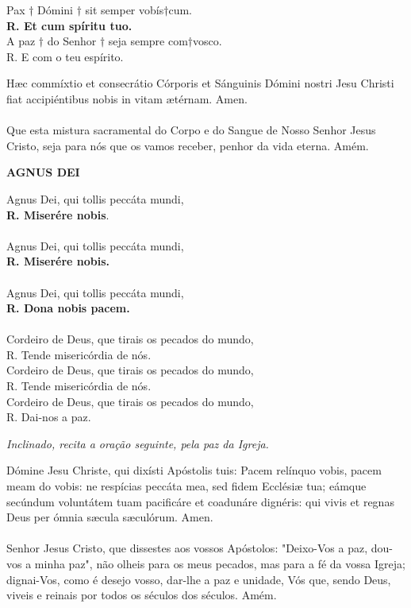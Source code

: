 \begin{multicols}{2}
	\noindent Pax $\dag$ Dómini $\dag$ sit semper vobís$\dag$cum. 
	\\ \textbf{R. Et cum spíritu tuo. }
	\\ A paz $\dag$ do Senhor $\dag$ seja sempre com$\dag$vosco.
	\\ R. E com o teu espírito.
\end{multicols}
\begin{multicols}{2}
	\noindent Hæc commíxtio et consecrátio Córporis et
	Sánguinis Dómini nostri Jesu Christi fiat
	accipiéntibus nobis in vitam ætérnam. Amen.
	\\
	\\ Que esta mistura sacramental do Corpo e do
	Sangue de Nosso Senhor Jesus Cristo, seja
	para nós que os vamos receber, penhor da
	vida eterna. Amém.
\end{multicols}
\begin{center}
	\textbf{AGNUS DEI}
\end{center}
\begin{multicols}{2}
	\noindent Agnus Dei, qui tollis peccáta mundi, 
	\\ \textbf{R. Miserére nobis}. 
	\\
	\\Agnus Dei, qui tollis peccáta mundi, 
	\\ \textbf{R. Miserére nobis. }
	\\
	\\Agnus Dei, qui tollis peccáta mundi, 
	\\ \textbf{R. Dona nobis pacem. }
	\\
	\\Cordeiro de Deus, que tirais os pecados do mundo, 
	\\R. Tende misericórdia de nós. 
	\\Cordeiro de Deus, que tirais os pecados do mundo, 
	\\R. Tende misericórdia de nós. 
	\\Cordeiro de Deus, que tirais os pecados do mundo, 
	\\R. Dai-nos a paz.
\end{multicols}
\begin{flushleft}
	\textit{Inclinado, recita a oração seguinte, pela paz da Igreja.}
\end{flushleft}
\begin{multicols}{2}
	\noindent Dómine Jesu Christe, qui dixísti Apóstolis tuis: Pacem relínquo vobis, pacem meam do vobis: ne respícias peccáta mea, sed fidem Ecclésiæ tua; eámque secúndum voluntátem tuam pacificáre et coadunáre dignéris: qui vivis et regnas Deus per ómnia sæcula sæculórum. Amen. 
	\\
	\\ Senhor Jesus Cristo, que dissestes aos vossos Apóstolos: "Deixo-Vos a paz, dou-vos a minha paz", não olheis para os meus pecados, mas para a fé da vossa Igreja; dignai-Vos, como é desejo vosso, dar-lhe a paz e unidade, Vós que, sendo Deus, viveis e reinais por todos os séculos dos séculos. Amém.
\end{multicols}
